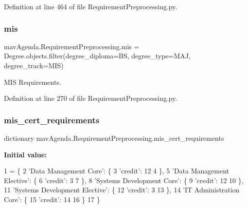 Definition at line 464 of file Requirement\+Preprocessing.\+py.

\mbox{\label{namespacemavAgenda_1_1RequirementPreprocessing_a209da90cd996d028eb448979246e2d92}} 
\subsubsection{\texorpdfstring{mis}{mis}}
{\footnotesize\ttfamily mav\+Agenda.\+Requirement\+Preprocessing.\+mis = Degree.\+objects.\+filter(degree\+\_\+diploma=\textquotesingle{}BS\textquotesingle{}, degree\+\_\+type=\textquotesingle{}M\+AJ\textquotesingle{}, degree\+\_\+track=\textquotesingle{}M\+IS\textquotesingle{})}



M\+IS Requirements. 



Definition at line 270 of file Requirement\+Preprocessing.\+py.

\mbox{\label{namespacemavAgenda_1_1RequirementPreprocessing_a8e814a7f1dbf40609b15287050470d6b}} 
\subsubsection{\texorpdfstring{mis\+\_\+cert\+\_\+requirements}{mis\_cert\_requirements}}
{\footnotesize\ttfamily dictionary mav\+Agenda.\+Requirement\+Preprocessing.\+mis\+\_\+cert\+\_\+requirements}

{\bfseries Initial value\+:}
\begin{DoxyCode}
1 =  \{
2     \textcolor{stringliteral}{'Data Management Core'}: \{
3         \textcolor{stringliteral}{'credit'}: 12
4     \},
5     \textcolor{stringliteral}{'Data Management Elective'}: \{
6         \textcolor{stringliteral}{'credit'}: 3
7     \},
8     \textcolor{stringliteral}{'Systems Development Core'}: \{
9         \textcolor{stringliteral}{'credit'}: 12
10     \},
11     \textcolor{stringliteral}{'Systems Development Elective'}: \{
12         \textcolor{stringliteral}{'credit'}: 3
13     \},
14     \textcolor{stringliteral}{'IT Administration Core'}: \{
15         \textcolor{stringliteral}{'credit'}: 14
16     \}
17 \}
\end{DoxyCode}


